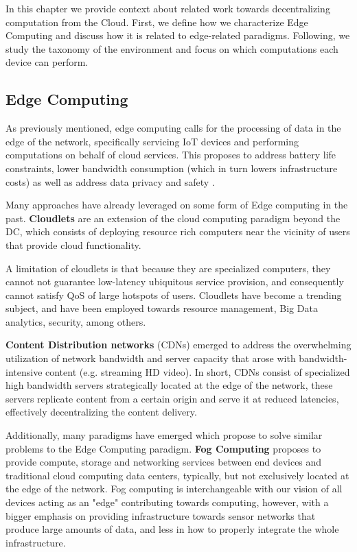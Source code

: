 

In this chapter we provide context about related work towards decentralizing computation from the Cloud. First, we define how we characterize Edge Computing and discuss how it is related to edge-related paradigms. Following, we study the taxonomy of the environment and focus on which computations each device can perform.

\subsection{Edge Computing}

As previously mentioned, edge computing calls for the processing of data in the edge of the network, specifically servicing IoT devices and performing computations on behalf of cloud services. This proposes to address battery life constraints, lower bandwidth consumption (which in turn lowers infrastructure costs) as well as address data privacy and safety \cite{7488250}. 

Many approaches have already leveraged on some form of Edge computing in the past. \textbf{Cloudlets} \cite{10.1145/2307849.2307858} are an extension of the cloud computing paradigm beyond the DC, which consists of deploying resource rich computers near the vicinity of users that provide cloud functionality.

A limitation of cloudlets is that because they are specialized computers, they cannot not guarantee low-latency ubiquitous service provision, and consequently cannot satisfy QoS of large hotspots of users. Cloudlets have become a trending subject, and have been employed towards resource management, Big Data analytics, security, among others.

\textbf{Content Distribution networks} \cite{peng2004cdn} (CDNs) emerged to address the overwhelming utilization of network bandwidth and server capacity that arose with bandwidth-intensive content (e.g. streaming HD video). In short, CDNs consist of specialized high bandwidth servers strategically located at the edge of the network, these servers replicate content from a certain origin and serve it at reduced latencies, effectively decentralizing the content delivery. 

Additionally, many paradigms have emerged which propose to solve similar problems to the Edge Computing paradigm. \textbf{Fog Computing} \cite{bonomi2012fog} proposes to provide compute, storage and networking services between end devices and traditional cloud computing data centers, typically, but not exclusively located at the edge of the network. Fog computing is interchangeable with our vision of all devices acting as an "edge" contributing towards computing, however, with a bigger emphasis on providing infrastructure towards sensor networks that produce large amounts of data, and less in how to properly integrate the whole infrastructure. 

